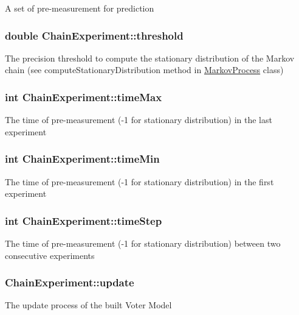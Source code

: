A set of pre-\/measurement for prediction \hypertarget{class_chain_experiment_ac17a3b382a5301adb5139fbaf8d53f49}{
\subsubsection[{threshold}]{\setlength{\rightskip}{0pt plus 5cm}double Chain\-Experiment\-::threshold}}\label{class_chain_experiment_ac17a3b382a5301adb5139fbaf8d53f49}
The precision threshold to compute the stationary distribution of the Markov chain (see compute\-Stationary\-Distribution method in \hyperlink{class_markov_process}{Markov\-Process} class) \hypertarget{class_chain_experiment_a9d7233a2ba46450f3ff10494100f21b9}{
\subsubsection[{time\-Max}]{\setlength{\rightskip}{0pt plus 5cm}int Chain\-Experiment\-::time\-Max}}\label{class_chain_experiment_a9d7233a2ba46450f3ff10494100f21b9}
The time of pre-\/measurement (-\/1 for stationary distribution) in the last experiment \hypertarget{class_chain_experiment_a92b1a39b84c5d3f2642db40b951e4582}{
\subsubsection[{time\-Min}]{\setlength{\rightskip}{0pt plus 5cm}int Chain\-Experiment\-::time\-Min}}\label{class_chain_experiment_a92b1a39b84c5d3f2642db40b951e4582}
The time of pre-\/measurement (-\/1 for stationary distribution) in the first experiment \hypertarget{class_chain_experiment_a5be9b1c06782e8e8e365080bca05e61d}{
\subsubsection[{time\-Step}]{\setlength{\rightskip}{0pt plus 5cm}int Chain\-Experiment\-::time\-Step}}\label{class_chain_experiment_a5be9b1c06782e8e8e365080bca05e61d}
The time of pre-\/measurement (-\/1 for stationary distribution) between two consecutive experiments \hypertarget{class_chain_experiment_a31b4dac82ed978b8ccad094496346fde}{
\subsubsection[{update}]{ Chain\-Experiment\-::update}}\label{class_chain_experiment_a31b4dac82ed978b8ccad094496346fde}
The update process of the built Voter Model 

